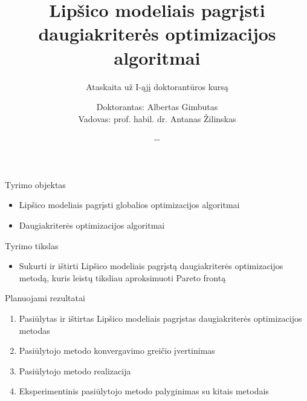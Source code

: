 \documentclass{beamer}
\title{Lipšico modeliais pagrįsti daugiakriterės optimizacijos algoritmai}
\subtitle{Ataskaita už I-ąjį doktorantūros kursą}
\author{\scriptsize \hspace{2em} Doktorantas: \hspace{2em} \small Albertas Gimbutas\\
\scriptsize \hspace{8em} Vadovas: \hspace{2em} \small prof. habil. dr. Antanas Žilinskas}
\institute[]
{\scriptsize \hspace{8em} Doktorantūros pradžios ir pabaigos metai:\hspace{2em} \small 2013 - 2017}
\date{\small \the\year-\the\month-\the\day}
\begin{document}
\begin{frame}
  \titlepage
\end{frame}


\begin{frame}[fragile]{Tyrimo objektas}
    \begin{itemize}
        \item Lipšico modeliais pagrįsti globalios optimizacijos algoritmai
            \medskip
        \item Daugiakriterės optimizacijos algoritmai
    \end{itemize}
\end{frame}


\begin{frame}[fragile]{Tyrimo tikslas}
    \begin{itemize}
        \item Sukurti ir ištirti Lipšico modeliais pagrįstą daugiakriterės
            optimizacijos metodą, kuris leistų tiksliau aproksimuoti Pareto frontą
    \end{itemize}
\end{frame}

\begin{frame}[fragile]{Planuojami rezultatai}
    \begin{enumerate}
        \item Pasiūlytas ir ištirtas Lipšico modeliais pagrįstas daugiakriterės optimizacijos metodas
        \item Pasiūlytojo metodo konvergavimo greičio įvertinimas
        \item Pasiūlytojo metodo realizacija
        \item Eksperimentinis pasiūlytojo metodo palyginimas su kitais metodais
    \end{enumerate}
\end{frame}
\end{document}
